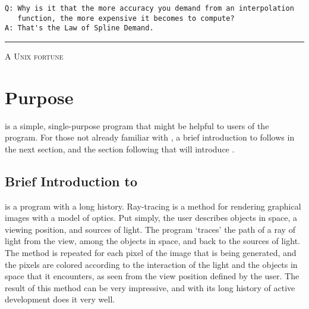 
\ifMKwx
	\small
\begin{verbatim}
Q: Why is it that the more accuracy you demand from an interpolation
   function, the more expensive it becomes to compute?
A: That's the Law of Spline Demand.
\end{verbatim}%
	\hrule
	\textsc{A Unix fortune}
	\normalsize
\else
\fi %

\section{Purpose}%
	\label{sec:epspline_purpose}
\IXpkgu{} is a simple, single-purpose program that might
be helpful to users of the \IXpov{} program.
For those not already familiar with \IXpov{},
a brief introduction to \IXpov{} follows in the next section,
and the section following that will introduce \IXpkg.

	\subsection{Brief Introduction to \dtypov}
	\label{ssec:intro_povray}
\IXpov{} is a  program with a long history.
Ray-tracing is a method for rendering
graphical images with a model of optics.
Put simply, the user describes objects in space, a viewing position,
and sources of light. The program `traces' the path of a ray of
light from the view, among the objects in space, and back to the sources
of light. The method is repeated for each pixel of the image that
is being generated, and the pixels are colored according to the
interaction of the light and the objects in space that it encounters,
as seen from the view position defined by the user.
The result of this method can be very impressive, and with its
long history of active development \IXpov{} does it very well.

